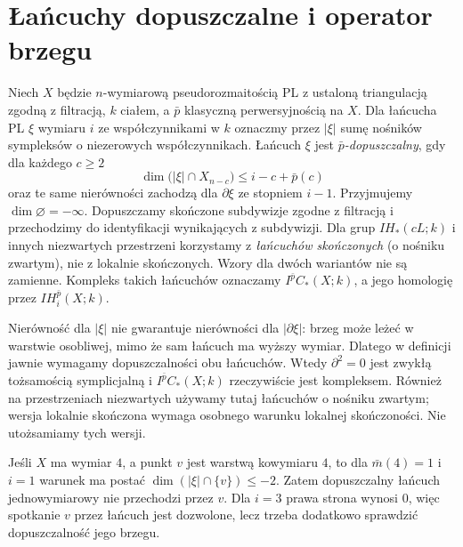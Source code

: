 \section{Łańcuchy dopuszczalne i operator brzegu}
\begin{definicja}[Dopuszczalność]
\label{def:allowability-xiii}
Niech $X$ będzie $n$-wymiarową pseudorozmaitością PL
z ustaloną triangulacją zgodną z filtracją, $k$ ciałem,
a $\bar p$ klasyczną perwersyjnością na $X$.
Dla łańcucha PL $\xi$ wymiaru $i$
ze współczynnikami w $k$ oznaczmy przez
$|\xi|$ sumę nośników sympleksów o niezerowych
współczynnikach. Łańcuch $\xi$ jest
\emph{$\bar p$-dopuszczalny}, gdy dla każdego $c\ge2$
\[
\dim\bigl(|\xi|\cap X_{n-c}\bigr)
\le i-c+\bar p(c)
\]
oraz te same nierówności zachodzą dla $\partial\xi$
ze stopniem $i-1$. Przyjmujemy
$\dim\varnothing=-\infty$. Dopuszczamy skończone
subdywizje zgodne z filtracją i przechodzimy do
identyfikacji wynikających z subdywizji.
Dla grup $IH_*(cL;k)$ i innych niezwartych przestrzeni
korzystamy z \emph{łańcuchów skończonych}
(o nośniku zwartym), nie z lokalnie skończonych.
Wzory dla dwóch wariantów nie są zamienne.
Kompleks takich łańcuchów oznaczamy
$I^{\bar p}C_*(X;k)$, a jego homologię przez
$IH_i^{\bar p}(X;k)$.
\end{definicja}
\begin{uwaga}
Nierówność dla $|\xi|$ nie gwarantuje nierówności
dla $|\partial\xi|$: brzeg może leżeć w warstwie
osobliwej, mimo że sam łańcuch ma wyższy wymiar.
Dlatego w definicji jawnie wymagamy dopuszczalności
obu łańcuchów. Wtedy $\partial^2=0$ jest zwykłą
tożsamością symplicjalną i
$I^{\bar p}C_*(X;k)$ rzeczywiście jest kompleksem.
Również na przestrzeniach niezwartych używamy tutaj
łańcuchów o nośniku zwartym;
wersja lokalnie skończona wymaga osobnego warunku
lokalnej skończoności. Nie utożsamiamy tych wersji.
\end{uwaga}
\begin{przyklad}
Jeśli $X$ ma wymiar $4$, a punkt $v$ jest warstwą
kowymiaru $4$, to dla $\bar m(4)=1$ i $i=1$
warunek ma postać $\dim(|\xi|\cap\{v\})\le-2$.
Zatem dopuszczalny łańcuch jednowymiarowy nie
przechodzi przez $v$. Dla $i=3$ prawa strona wynosi
$0$, więc spotkanie $v$ przez łańcuch jest dozwolone,
lecz trzeba dodatkowo sprawdzić dopuszczalność jego brzegu.
\end{przyklad}

